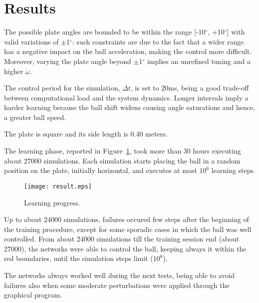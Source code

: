 
\section{Results}
\label{sec:results}

The possible plate angles are bounded to be within the range
[-10$^\circ$, +10$^\circ$] with valid variations of $\pm$1$^\circ$:
such constraints are due to the fact that a wider range has a negative impact
on the ball acceleration, making the control more difficult. Moreover, varying
the plate angle beyond $\pm$1$^\circ$ implies an unrefined tuning and a
higher $\dot{\omega}$.

The control period for the simulation, $\Delta t$, is set to 20ms, being a
good trade-off between computational load and the system dynamics.
Longer intervals imply a harder learning because the ball shift widens
causing angle saturations and hence, a greater ball speed.

The plate is square and its side length is 0.40 meters.

The learning phase, reported in Figure~\ref{fig:learning}, took more than 30
hours executing about 27000 simulations.
Each simulation starts placing the ball in a random position on the plate,
initially horizontal, and executes at most $10^6$ learning steps.

\begin{figure}[htb]
  \centering
  \texttt{[image: result.eps]}
  \caption{Learning progress.}
  \label{fig:learning}
\end{figure}

Up to about 24000 simulations, failures occured few steps after the beginning
of the training procedure, except for some sporadic cases in which the ball was
well controlled.
From about 24000 simulations till the training session end (about 27000),
the networks were able to control the ball, keeping always it within the
red boundaries, until the simulation steps limit ($10^6$).

The networks always worked well during the next tests, being able to avoid
failures also when some moderate perturbations were applied through the
graphical program.


